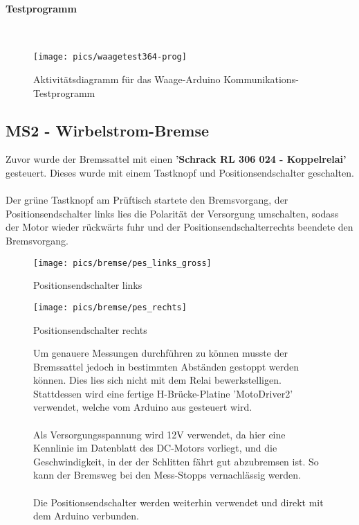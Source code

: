 \documentclass[12pt,a4paper]{article}
\begin{document}
\paragraph{Testprogramm}\mbox{}\\
\begin{figure}[h!]
	\centering
	\texttt{[image: pics/waagetest364-prog]}
	\caption{Aktivitätsdiagramm für das Waage-Arduino Kommunikations-Testprogramm}
\end{figure}
%
%
\newpage
\subsection{MS2 - Wirbelstrom-Bremse}
Zuvor wurde der Bremssattel mit einen {\bf 'Schrack RL 306 024 - Koppelrelai'} gesteuert. 
Dieses wurde mit einem Tastknopf und Positionsendschalter geschalten. \\\\
Der grüne Tastknopf am Prüftisch startete den Bremsvorgang, 
der Positionsendschalter links lies die Polarität der Versorgung umschalten, 
sodass der Motor wieder rückwärts fuhr und der Positionsendschalterrechts beendete den Bremsvorgang. \\
%
\begin{figure}[h!]
  \centering
  \begin{minipage}[b]{0.4\textwidth}
    \texttt{[image: pics/bremse/pes\_links\_gross]}
    \caption{Positionsendschalter links}
  \end{minipage}
  \hspace{10mm}
  \begin{minipage}[b]{0.4\textwidth}
    \texttt{[image: pics/bremse/pes\_rechts]}
    \caption{Positionsendschalter rechts}
  \end{minipage}
\end{figure}
%
\begin{figure}[h!]
Um genauere Messungen durchführen zu können musste der Bremssattel jedoch in bestimmten Abständen gestoppt werden können. 
Dies lies sich nicht mit dem Relai bewerkstelligen. \\
Stattdessen wird eine fertige H-Brücke-Platine 'MotoDriver2' verwendet, welche vom Arduino aus gesteuert wird. \\\\
Als Versorgungsspannung wird 12V verwendet, da hier eine Kennlinie im Datenblatt des DC-Motors vorliegt, und 
die Geschwindigkeit, in der der Schlitten fährt gut abzubremsen ist. So kann der Bremsweg bei den Mess-Stopps vernachlässig werden. \\\\
Die Positionsendschalter werden weiterhin verwendet und direkt mit dem Arduino verbunden. 
\end{figure}
%
%
\end{document}
